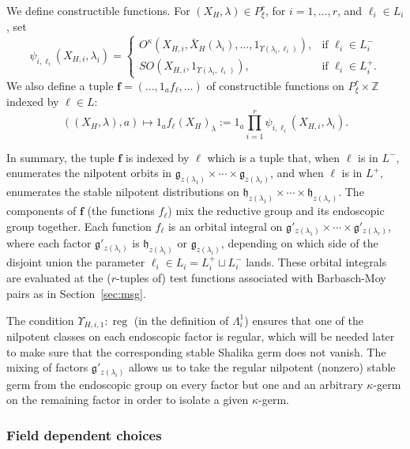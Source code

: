 \documentclass[12pt]{amsart}
\newcommand{\op}[1]{\operatorname{#1}}
\newcommand{\ring}[1]{{\mathbb #1}}
\def\Y{\Upsilon}
\def\bf{\mathbf f}
\newcommand{\fg}{\mathfrak{g}}
\newcommand{\fh}{\mathfrak{h}}
\theoremstyle{plain}
\theoremstyle{definition}
\begin{document}
We define constructible functions.  For $(X_H,\lambda)\in
P^r_\xi$,  for $i=1,\ldots,r$, and $\ell_i\in L_i$,
set
\begin{equation}\label{eqn:psi}
\psi_{i,\ell_i}(X_{H,i},\lambda_i) = 
\begin{cases}   
  O^\kappa(X_{H,i},\bar X_H(\lambda_i),\ldots,1_{\Y(\lambda_i,\ell_i)}),
   & \text{if } \ell_i\in L^-_i \\
  SO(X_{H,i},1_{\Y(\lambda_i,\ell_i)}),
   & \text{if } \ell_i\in L^+_i.
\end{cases}
\end{equation}
We also define a tuple $\bf=(\ldots,1_a f_\ell,\ldots)$ of constructible
functions on $P^r_\xi\times\ring{Z}$ indexed by $\ell\in L$:
\[
((X_H,\lambda),a)\mapsto 1_a f_\ell(X_H)_\lambda 
:= 1_a \prod_{i=1}^r \psi_{i,\ell_i}(X_{H,i},\lambda_i).
\]


In summary, the tuple $\bf$ is indexed by $\ell$ which is a tuple
that, when $\ell$ is in $L^-$, enumerates the nilpotent orbits in
$\fg_{z(\lambda_1)}\times \cdots\times \fg_{z(\lambda_r)}$, and when
$\ell$ is in $L^+$, enumerates the stable nilpotent distributions on
$\fh_{z(\lambda_1)}\times \cdots\times \fh_{z(\lambda_r)}$.  The
components of $\bf$ (the functions $f_\ell$) mix the reductive group
and its endoscopic group together.  Each function $f_\ell$ is an
orbital integral on $\fg'_{z(\lambda_1)}\times \cdots\times
\fg'_{z(\lambda_r)}$, where each factor $\fg'_{z(\lambda_i)}$ is
$\fh_{z(\lambda_i)}$ or $\fg_{z(\lambda_i)}$, depending on which side
of the disjoint union the parameter $\ell_i\in L_i = L^+_i\sqcup
L^-_i$ lands.  These orbital integrals are evaluated at the
($r$-tuples of) test functions associated with Barbasch-Moy pairs as
in Section~\ref{sec:msg}. 

The condition $\Upsilon_{H,i,1}:\op{reg}$ (in the
definition of $\Lambda^1_i$) ensures that one of the nilpotent classes
on each endoscopic factor is regular, which will be needed later to
make sure that the corresponding stable Shalika germ does not vanish.
The mixing of factors $\fg'_{z(\lambda_i)}$ allows us to take the
regular nilpotent (nonzero) stable germ from the endoscopic group on every factor
but one and an arbitrary $\kappa$-germ on the remaining factor in
order to isolate a given $\kappa$-germ.

\subsubsection{Field dependent choices}\label{sec:field}
\end{document}
